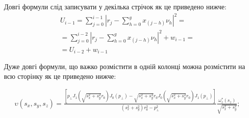 \begin{multicols}{2}
%

Довгі формули слід записувати у декілька стрічок як це приведено нижче:
\begin{multline}\label{radap1345eq2}
U_{i-1}= \sum\limits_{j=0}^{i-1}\left| r_j - \sum\limits_{h=0}^{g} x_{(j-h)} \nu_h \right|^2 =\\= \sum\limits_{j=0}^{i-2}\left| r_j - \sum\limits_{h=0}^{g} x_{(j-h)} \nu_h \right|^2 +w_{i-1} =\\= U_{i-2} + w_{i-1} 
\end{multline}

Дуже довгі формули, що важко розмістити в одній колонці можна розмістити на всю сторінку як це приведено нижче:

\end{multicols} %
\begin{multline}
\upsilon({{s}_{x}},{{s}_{y}},{{s}_{z}})\!=\!\frac{\left[{{p}_{\bot }}{{J}_{1}}\left(\sqrt{s_{x}^{2}+s_{y}^{2}}{{r}_{0}}\right){{J}_{0}}({{p}_{\bot }})-\sqrt{s_{x}^{2}+s_{y}^{2}}{{r}_{0}}{{J}_{0}}\left(\sqrt{s_{x}^{2}+s_{y}^{2}}{{r}_{0}}\right){{J}_{1}}({{p}_{\bot }})\right]}{(s_{x}^{2}+s_{y}^{2})r_{0}^{2}-p_{\bot }^{2}}\frac{\omega _{z}^{*}({{s}_{z}})}{\sqrt{s_{x}^{2}+s_{y}^{2}}};  
\end{multline}
